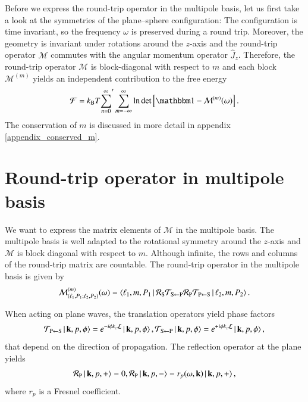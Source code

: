 Before we express the round-trip operator in the multipole basis, let us first
take a look at the symmetries of the plane--sphere configuration: The
configuration is time invariant, so the frequency $\omega$ is preserved during
a round trip. Moreover, the geometry is invariant under rotations around the
$z$-axis and the round-trip operator $\mathcal{M}$ commutes with the angular
momentum operator $\hat J_z$. Therefore, the round-trip operator $\mathcal{M}$
is block-diagonal with respect to $m$ and each block $\mathcal{M}^{(m)}$ yields
an independent contribution to the free energy
\begin{equation}
\F = \kb T {\sum_{n=0}^\infty}^\prime \sum_{m=-\infty}^\infty \log \det \left[\Id - \mathcal{M}^{(m)}(\omega) \right].
\end{equation}
The conservation of $m$ is discussed in more detail in appendix \ref{appendix_conserved_m}.


\section{Round-trip operator in multipole basis}

We want to express the matrix elements of $\mathcal{M}$ in the multipole basis.
The multipole basis is well adapted to the rotational symmetry around the
$z$-axis and $\mathcal{M}$ is block diagonal with respect to $m$. Although
infinite, the rows and columns of the round-trip matrix are countable. The
round-trip operator in the multipole basis is given by
\begin{equation}
\label{eq:scattering_0}
\mathcal{M}^{(m)}_{(\ell_1,P_1;\ell_2,P_2)}(\omega) = \braket{\ell_1,m,P_1 \, | \, \mathcal{R}_\text{S} \mathcal{T}_{\text{S}\leftarrow\text{P}} \mathcal{R}_\text{P} \mathcal{T}_{\text{P}\leftarrow\text{S}} \, | \, \ell_2,m,P_2}.
\end{equation}

When acting on plane waves, the
translation operators yield phase factors
\begin{equation}
\mathcal{T}_{\text{P}\leftarrow\text{S}} \ket{\, {\mathbf{k}}, p, \phi} = e^{-i \phi k_z \mathcal{L}} \ket{\, {\mathbf{k}}, p, \phi}, \\
\mathcal{T}_{\text{S}\leftarrow\text{P}} \ket{\, {\mathbf{k}}, p, \phi} = e^{+i \phi k_z \mathcal{L}} \ket{\, {\mathbf{k}}, p, \phi},
\end{equation}
that depend on the direction of propagation.
The reflection operator at the plane yields
\begin{equation}
\mathcal{R}_\text{P} \ket{\, {\mathbf{k}}, p, +} = 0, \\
\mathcal{R}_\text{P} \ket{\, {\mathbf{k}}, p, -} = r_p(\omega, {\mathbf{k}}) \ket{\, {\mathbf{k}}, p, +},
\end{equation}
where $r_p$ is a Fresnel coefficient.

